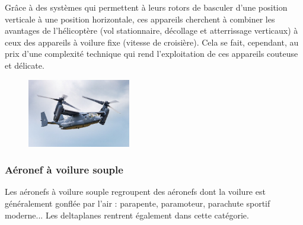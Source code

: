 		Grâce à des systèmes qui permettent à leurs rotors de basculer d'une position verticale à une position horizontale, ces appareils cherchent à combiner les avantages de l'hélicoptère (vol stationnaire, décollage et atterrissage verticaux) à ceux des appareils à voilure fixe (vitesse de croisière). Cela se fait, cependant, au prix d'une complexité technique qui rend l'exploitation de ces appareils couteuse et délicate.
		
	\begin{figure}[H]
  	\centering
    \includegraphics[width=0.4\textwidth]{01-EtudeAeronefs/img/tiltrotor.jpg}
	\end{figure}	
		
	\subsubsection{Aéronef à voilure souple}
	Les aéronefs à voilure souple  regroupent des aéronefs dont la voilure est généralement gonflée par l'air : parapente, paramoteur, parachute sportif moderne... Les deltaplanes rentrent également dans cette catégorie.
	
	
